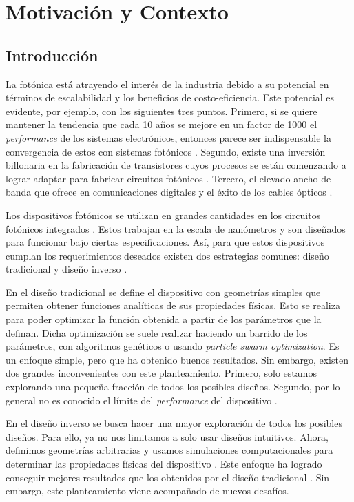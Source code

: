 \chapter{Motivación y Contexto}

\section{Introducción}

La fotónica está atrayendo el interés de la industria debido a su potencial en términos de escalabilidad y los beneficios de costo-eficiencia. 
Este potencial es evidente, por ejemplo, con los siguientes tres puntos. 
Primero, si se quiere mantener la tendencia que cada 10 años se mejore en un factor de 1000 el \emph{performance} de los sistemas electrónicos, entonces parece ser indispensable la convergencia de estos con sistemas fotónicos \citep{Glick2018}. 
Segundo, existe una inversión billonaria en la fabricación de transistores cuyos procesos se están comenzando a lograr adaptar para fabricar circuitos fotónicos \citep{LukasChrostowski2010}.
Tercero, el elevado ancho de banda que ofrece en comunicaciones digitales y el éxito de los cables ópticos \citep{LukasChrostowski2010, Glick2018}.

Los dispositivos fotónicos se utilizan en grandes cantidades en los circuitos fotónicos integrados \citep{LukasChrostowski2010}. 
Estos trabajan en la escala de nanómetros y son diseñados para funcionar bajo ciertas especificaciones. 
Así, para que estos dispositivos cumplan los requerimientos deseados existen dos estrategias comunes: diseño tradicional y diseño inverso \citep{Molesky2018}.


En el diseño tradicional se define el dispositivo con geometrías simples que permiten obtener funciones analíticas de sus propiedades físicas. 
Esto se realiza para poder optimizar la función obtenida a partir de los parámetros que la definan. Dicha optimización se suele realizar haciendo
un barrido de los parámetros, con algoritmos genéticos o usando \emph{particle swarm optimization}. Es un enfoque simple, pero que ha obtenido
buenos resultados. Sin embargo, existen dos grandes inconvenientes con este planteamiento. 
Primero, solo estamos explorando una pequeña fracción de todos los posibles diseños.
Segundo, por lo general no es conocido el límite del \emph{performance} del dispositivo \citep{Molesky2018, Su2020}.


En el diseño inverso se busca hacer una mayor exploración de todos los posibles diseños. 
Para ello, ya no nos limitamos a solo usar diseños intuitivos. Ahora, definimos geometrías arbitrarias y usamos simulaciones computacionales para determinar las propiedades físicas del dispositivo \citep{Molesky2018, Su2020}. Este enfoque ha logrado conseguir mejores resultados que los obtenidos por el diseño tradicional \citep{Su2018, Molesky2018}. Sin embargo, este planteamiento viene acompañado de nuevos desafíos.


